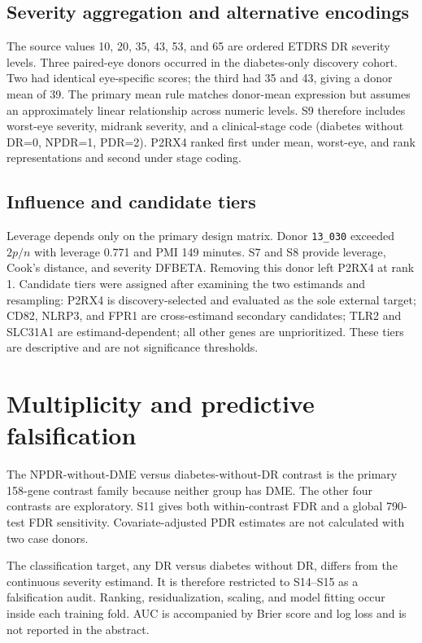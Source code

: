 \documentclass[12pt]{article}
\begin{document}
\subsection{Severity aggregation and alternative encodings}

The source values 10, 20, 35, 43, 53, and 65 are ordered ETDRS DR severity levels. Three paired-eye donors occurred in the diabetes-only discovery cohort. Two had identical eye-specific scores; the third had 35 and 43, giving a donor mean of 39. The primary mean rule matches donor-mean expression but assumes an approximately linear relationship across numeric levels. S9 therefore includes worst-eye severity, midrank severity, and a clinical-stage code (diabetes without DR=0, NPDR=1, PDR=2). P2RX4 ranked first under mean, worst-eye, and rank representations and second under stage coding.

\subsection{Influence and candidate tiers}

Leverage depends only on the primary design matrix. Donor \texttt{13\_030} exceeded $2p/n$ with leverage 0.771 and PMI 149 minutes. S7 and S8 provide leverage, Cook's distance, and severity DFBETA. Removing this donor left P2RX4 at rank 1. Candidate tiers were assigned after examining the two estimands and resampling: P2RX4 is discovery-selected and evaluated as the sole external target; CD82, NLRP3, and FPR1 are cross-estimand secondary candidates; TLR2 and SLC31A1 are estimand-dependent; all other genes are unprioritized. These tiers are descriptive and are not significance thresholds.

\section{Multiplicity and predictive falsification}

The NPDR-without-DME versus diabetes-without-DR contrast is the primary 158-gene contrast family because neither group has DME. The other four contrasts are exploratory. S11 gives both within-contrast FDR and a global 790-test FDR sensitivity. Covariate-adjusted PDR estimates are not calculated with two case donors.

The classification target, any DR versus diabetes without DR, differs from the continuous severity estimand. It is therefore restricted to S14--S15 as a falsification audit. Ranking, residualization, scaling, and model fitting occur inside each training fold. AUC is accompanied by Brier score and log loss and is not reported in the abstract.
\end{document}
